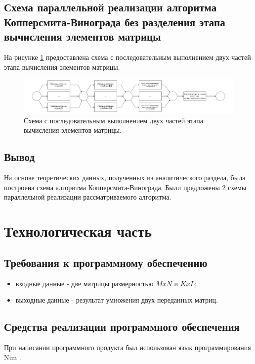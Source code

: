 \documentclass[12pt]{report}
\begin{document}
\section{Схема параллельной реализации алгоритма Копперсмита-Винограда без разделения этапа вычисления элементов матрицы}
На рисунке \ref{img:scheme2} предоставлена схема с последовательным выполнением двух частей этапа вычисления элементов матрицы.

\begin{figure}
\begin{center}
\includegraphics[scale=0.27]{inc/img/paralScheme2.png}
\captionsetup{justification=centering}
	\caption{Схема с последовательным выполнением двух частей этапа вычисления элементов матрицы.}
	\label{img:scheme2}	
\end{center}
\end{figure}
\newpage

\section*{Вывод}
На основе теоретических данных, полученных из аналитического раздела, была построена схема алгоритма Копперсмита-Винограда. Были предложены 2 схемы параллельной реализации рассматриваемого алгоритма.

\chapter{Технологическая часть}
\section{Требования к программному обеспечению}
\begin{itemize}
\item входные данные - две матрицы размерностью $MxN$ и $KxL$;
\item выходные данные - результат умножения двух переданных матриц.
\end{itemize}

\section{Средства реализации программного обеспечения}
При написании программного продукта был использован язык программирования Nim \cite{Nim}.
\end{document}
